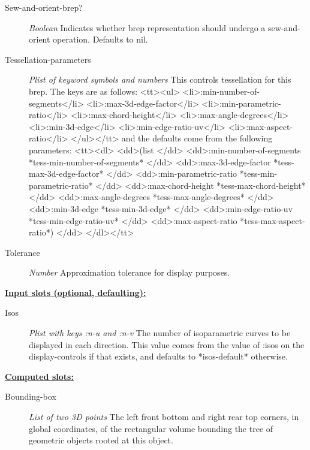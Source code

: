 \documentclass [11pt]{book}
\begin{document}
\begin{itemize}
\begin{description}
\item [Sew-and-orient-brep?]
\emph{Boolean} Indicates whether brep representation should undergo a
sew-and-orient operation. Defaults to nil.


\item [Tessellation-parameters]
\emph{Plist of keyword symbols and numbers} This controls tessellation for this brep.
The keys are as follows:
<tt><ul>
<li>:min-number-of-segments</li>
<li>:max-3d-edge-factor</li>
<li>:min-parametric-ratio</li>
<li>:max-chord-height</li>
<li>:max-angle-degrees</li>
<li>:min-3d-edge</li>
<li>:min-edge-ratio-uv</li>
<li>:max-aspect-ratio</li>
</ul></tt>
and the defaults come from the following parameters:
<tt><dl>
<dd>(list </dd>
<dd>:min-number-of-segments *tess-min-number-of-segments* </dd>
<dd>:max-3d-edge-factor *tess-max-3d-edge-factor* </dd>
<dd>:min-parametric-ratio *tess-min-parametric-ratio* </dd>
<dd>:max-chord-height *tess-max-chord-height* </dd>
<dd>:max-angle-degrees *tess-max-angle-degrees* </dd>
<dd>:min-3d-edge *tess-min-3d-edge* </dd>
<dd>:min-edge-ratio-uv *tess-min-edge-ratio-uv* </dd>
<dd>:max-aspect-ratio *tess-max-aspect-ratio*) </dd>
</dl></tt>


\item [Tolerance]
\emph{Number} Approximation tolerance for display purposes.


\end{description}






\textbf{
\underline{Input slots (optional, defaulting):}}

\begin{description}

\item [Isos]
\emph{Plist with keys :n-u and :n-v} The number of isoparametric
curves to be displayed in each direction. This value comes from the
value of :isos on the display-controls if that exists, and defaults
to *isos-default* otherwise.


\end{description}






\textbf{
\underline{Computed slots:}}

\begin{description}

\item [Bounding-box]
\emph{List of two 3D points} The left front bottom and right rear top corners, in global coordinates,
of the rectangular volume bounding the tree of geometric objects rooted at this object.



\end{description}
\end{itemize}
\end{document}
